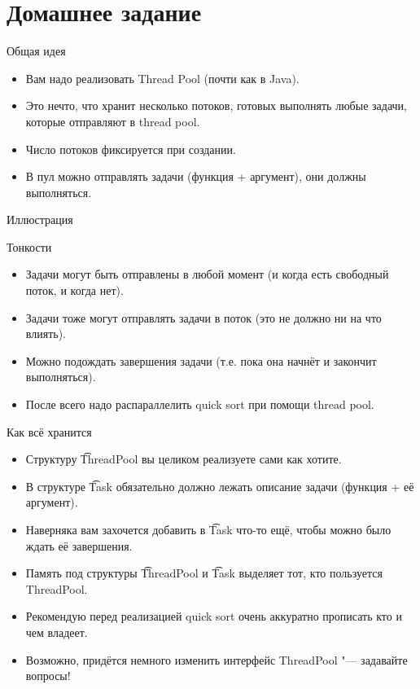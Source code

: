 \section{Домашнее задание}

\begin{frame}
\end{frame}

\begin{frame}{Общая идея}
	\begin{itemize}
		\item Вам надо реализовать Thread Pool (почти как в Java).
		\item Это нечто, что хранит несколько потоков, готовых выполнять любые задачи, которые отправляют в thread pool.
		\item Число потоков фиксируется при создании.
		\item В пул можно отправлять задачи (функция + аргумент), они должны выполняться.
	\end{itemize}
\end{frame}


\begin{frame}{Иллюстрация}
\end{frame}

\begin{frame}{Тонкости}
	\begin{itemize}
		\item Задачи могут быть отправлены в любой момент (и когда есть свободный поток, и когда нет).
		\item Задачи тоже могут отправлять задачи в поток (это не должно ни на что влиять).
		\item Можно подождать завершения задачи (т.е. пока она начнёт и закончит выполняться).
		\item После всего надо распараллелить quick sort при помощи thread pool.
	\end{itemize}
\end{frame}

\begin{frame}{Как всё хранится}
	\begin{itemize}
		\item Структуру \t{ThreadPool} вы целиком реализуете сами как хотите.
		\item В структуре \t{Task} обязательно должно лежать описание задачи (функция + её аргумент).
		\item Наверняка вам захочется добавить в \t{Task} что-то ещё, чтобы можно было ждать её завершения.
		\item Память под структуры \t{ThreadPool} и \t{Task} выделяет тот, кто пользуется ThreadPool.
		\item Рекомендую перед реализацией quick sort очень аккуратно прописать кто и чем владеет.
		\item Возможно, придётся немного изменить интерфейс ThreadPool "--- задавайте вопросы!
	\end{itemize}
\end{frame}

